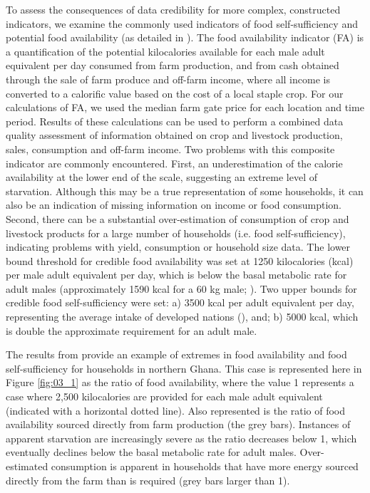 To assess the consequences of data credibility for more complex, constructed indicators, we examine the commonly used indicators of food self-sufficiency and potential food availability (as detailed in \citealp{Frelat2016458}). The food availability indicator (FA) is a quantification of the potential kilocalories available for each male adult equivalent per day consumed from farm production, and from cash obtained through the sale of farm produce and off-farm income, where all income is converted to a calorific value based on the cost of a local staple crop. For our calculations of FA, we used the median farm gate price for each location and time period. Results of these calculations can be used to perform a combined data quality assessment of information obtained on crop and livestock production, sales, consumption and off-farm income. Two problems with this composite indicator are commonly encountered. First, an underestimation of the calorie availability at the lower end of the scale, suggesting an extreme level of starvation. Although this may be a true representation of some households, it can also be an indication of missing information on income or food consumption. Second, there can be a substantial over-estimation of consumption of crop and livestock products for a large number of households (i.e. food self-sufficiency), indicating problems with yield, consumption or household size data. The lower bound threshold for credible food availability was set at 1250 kilocalories (kcal) per male adult equivalent per day, which is below the basal metabolic rate for adult males (approximately 1590 kcal for a 60 kg male; \citealp{FoodandAgricuturalOrganization2001}). Two upper bounds for credible food self-sufficiency were set: a) 3500 kcal per adult equivalent per day, representing the average intake of developed nations (\citealp{OrganisationforEconomicCo-operationandDevelopmentOECD2017}), and; b) 5000 kcal, which is double the approximate requirement for an adult male.

The results from \citet{Rosenstock2017} provide an example of extremes in food availability and food self-sufficiency for households in northern Ghana. This case is represented here in Figure \ref{fig:03_1} as the ratio of food availability, where the value 1 represents a case where 2,500 kilocalories are provided for each male adult equivalent (indicated with a horizontal dotted line). Also represented is the ratio of food availability sourced directly from farm production (the grey bars). Instances of apparent starvation are increasingly severe as the ratio decreases below 1, which eventually declines below the basal metabolic rate for adult males. Over-estimated consumption is apparent in households that have more energy sourced directly from the farm than is required (grey bars larger than 1).

